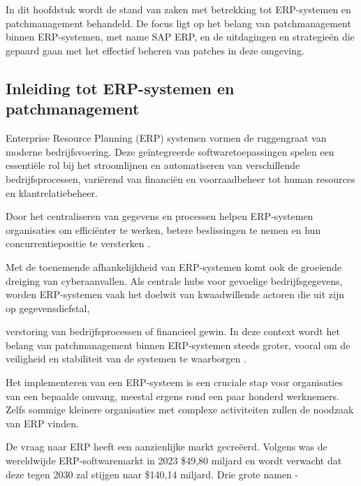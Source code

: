 \chapter{}
\label{ch:stand-van-zaken}


In dit hoofdstuk wordt de stand van zaken met betrekking tot ERP-systemen en patchmanagement behandeld. De focus ligt op het belang van patchmanagement binnen ERP-systemen, met name SAP ERP, en de uitdagingen en strategieën die gepaard gaan met het effectief beheren van patches in deze omgeving.

\section{Inleiding tot ERP-systemen en patchmanagement}
Enterprise Resource Planning (ERP) systemen vormen de ruggengraat van moderne bedrijfsvoering. Deze geïntegreerde softwaretoepassingen spelen een essentiële rol bij het stroomlijnen en automatiseren van verschillende bedrijfsprocessen, variërend van financiën en voorraadbeheer tot human resources en klantrelatiebeheer.

Door het centraliseren van gegevens en processen helpen ERP-systemen organisaties om efficiënter te werken, betere beslissingen te nemen en hun concurrentiepositie te versterken \autocite{StatistiekVlaanderen2022}.

Met de toenemende afhankelijkheid van ERP-systemen komt ook de groeiende dreiging van cyberaanvallen. Als centrale hubs voor gevoelige bedrijfsgegevens, worden ERP-systemen vaak het doelwit van kwaadwillende actoren die uit zijn op gegevensdiefstal, 

verstoring van bedrijfsprocessen of financieel gewin. In deze context wordt het belang van patchmanagement binnen ERP-systemen steeds groter, vooral om de veiligheid en stabiliteit van de systemen te waarborgen \autocite{Pearson2024}.

Het implementeren van een ERP-systeem is een cruciale stap voor organisaties van een bepaalde omvang, meestal ergens rond een paar honderd werknemers. Zelfs sommige kleinere organisaties met complexe activiteiten zullen de noodzaak van ERP vinden.

De vraag naar ERP heeft een aanzienlijke markt gecreëerd. Volgens \textcite{Madh2024} was de wereldwijde ERP-softwaremarkt in 2023 \$49,80 miljard en wordt verwacht dat deze tegen 2030 zal stijgen naar \$140,14 miljard. Drie grote namen - 

